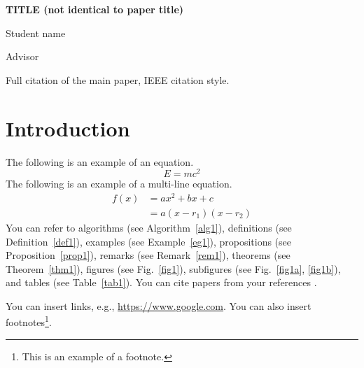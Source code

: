 \documentclass[12pt,onecolumn,letterpaper]{IEEEtran}  %
\begin{document}
\begin{titlepage}
    \centering
    
    {\textbf{TITLE (not identical to paper title)}}
    
    \vspace{5\baselineskip}
    
    {Student name}
    
    \vspace{5\baselineskip}
    
    {Advisor}
    
    \vspace{5\baselineskip}

    \begin{abstract}
        \lipsum[1]
    \end{abstract}
    
    \vfill
    
    \begin{minipage}{\textwidth}
        \footnotesize
        Full citation of the main paper, IEEE citation style. 
    \end{minipage}
    
\end{titlepage}


\section{Introduction}
The following is an example of an equation.
\begin{equation}
    E = mc^2
\end{equation}
The following is an example of a multi-line equation.
\begin{align}
    f(x) & = ax^2 + bx + c \\
    & = a(x - r_1)(x - r_2)
\end{align}
You can refer to algorithms (see Algorithm~\ref{alg1}), definitions (see Definition~\ref{def1}), examples (see Example~\ref{eg1}), propositions (see Proposition~\ref{prop1}), remarks (see Remark~\ref{rem1}), theorems (see Theorem~\ref{thm1}), figures (see Fig.~\ref{fig1}), subfigures (see Fig.~\ref{fig1a}, \ref{fig1b}), and tables (see Table~\ref{tab1}). 
You can cite papers from your references \cite{boyd_distributed_2010}.

You can insert links, e.g., \href{https://www.google.com}{https://www.google.com}.
You can also insert footnotes\footnote{This is an example of a footnote.}.
\end{document}
